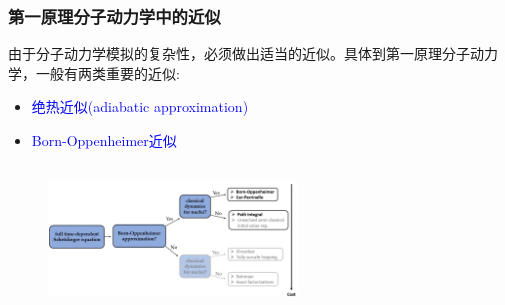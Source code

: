 %
\frame
{
	\frametitle{第一原理分子动力学中的近似}
	由于分子动力学模拟的复杂性，必须做出适当的近似。具体到第一原理分子动力学，一般有两类重要的近似:
	\begin{itemize}
		\item \textcolor{blue}{绝热近似\textrm{(adiabatic approximation)}}\\
			{\fontsize{6.2pt}{4.2pt}\selectfont{假设电子-原子核在能量层面上完全分离，彼此间没有能量传递}}
		\item \textcolor{blue}{\textrm{Born-Oppenheimer}近似}\\
			{\fontsize{6.2pt}{4.2pt}}
	\end{itemize}
\begin{figure}[h!]
\centering
\vspace*{-0.25in}
\includegraphics[height=1.55in,width=2.6in,viewport=0 0 440 230,clip]{Figures/Molecular-dynamics_Claaified.png}
\label{Molecular-dynamics_Classified}
\end{figure}
}

